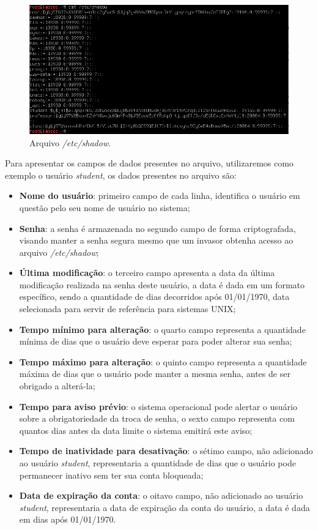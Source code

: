 \documentclass[
	12pt,				%
	oneside,   	        %
	a4paper,			%
	english,			%
	french,				%
	spanish,			%
	brazil,				%
	]{pacotes/abntex2}
\begin{document}
\begin{figure}[H]
  \centering
  \includegraphics[scale=0.7]{figuras/shadow.png}
  \caption{Arquivo \textit{/etc/shadow}.}
  \label{fig:shadow}
\end{figure}

Para apresentar os campos de dados presentes no arquivo, utilizaremos como exemplo o usuário \textit{student}, os dados presentes no arquivo são:
\begin{itemize}
    \item \textbf{Nome do usuário}: primeiro campo de cada linha, identifica o usuário em questão pelo seu nome de usuário no sistema;
    \item \textbf{Senha}: a senha é armazenada no segundo campo de forma criptografada, visando manter a senha segura mesmo que um invasor obtenha acesso ao arquivo \textit{/etc/shadow};
    \item \textbf{Última modificação}: o terceiro campo apresenta a data da última modificação realizada na senha deste usuário, a data é dada em um formato específico, sendo a quantidade de dias decorridos após 01/01/1970, data selecionada para servir de referência para sistemas UNIX;
    \item \textbf{Tempo mínimo para alteração}: o quarto campo representa a quantidade mínima de dias que o usuário deve esperar para poder alterar sua senha;
    \item \textbf{Tempo máximo para alteração}: o quinto campo representa a quantidade máxima de dias que o usuário pode manter a mesma senha, antes de ser obrigado a alterá-la;
    \item \textbf{Tempo para aviso prévio}: o sistema operacional pode alertar o usuário sobre a obrigatoriedade da troca de senha, o sexto campo representa com quantos dias antes da data limite o sistema emitirá este aviso;
    \item \textbf{Tempo de inatividade para desativação}: o sétimo campo, não adicionado ao usuário \textit{student}, representaria a quantidade de dias que o usuário pode permanecer inativo sem ter sua conta bloqueada;
    \item \textbf{Data de expiração da conta}: o oitavo campo, não adicionado ao usuário \textit{student}, representaria a data de expiração da conta do usuário, a data é dada em dias após 01/01/1970.
\end{itemize}
\end{document}
